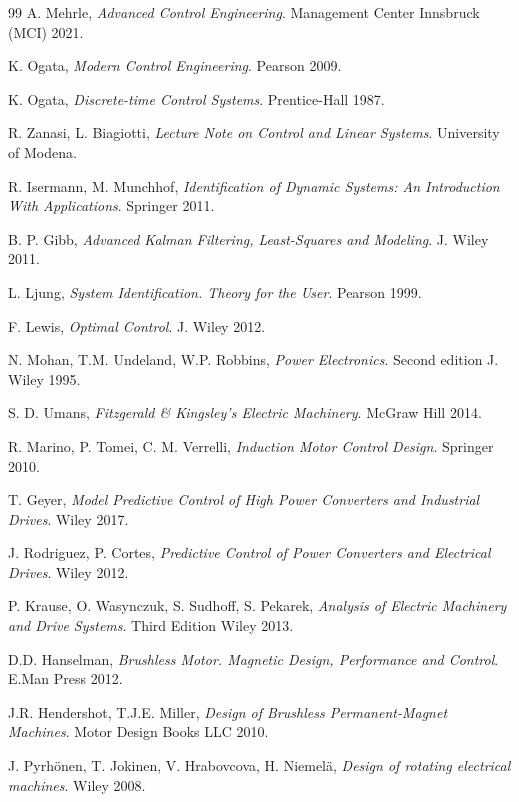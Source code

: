 \documentclass[12pt,a4paper,oneside]{book}
\begin{document}
\clearpage
\begin{thebibliography}{99}
	A. Mehrle, \emph{Advanced Control Engineering}. Management Center Innsbruck (MCI) 2021.
	
	K. Ogata, \emph{Modern Control Engineering}. Pearson 2009.	
	
	K. Ogata, \emph{Discrete-time Control Systems}. Prentice-Hall 1987.
	
	R. Zanasi, L. Biagiotti, \emph{Lecture Note on Control and Linear Systems}. University of Modena.
	
	R. Isermann, M. Munchhof, \emph{Identification of Dynamic Systems: An Introduction With Applications}. Springer 2011.
	
	B. P. Gibb, \emph{Advanced Kalman Filtering, Least-Squares and Modeling}. J. Wiley 2011.

	L. Ljung,  \emph{System Identification. Theory for the User}. Pearson 1999.

	F. Lewis, \emph{Optimal Control}. J. Wiley 2012.

	N. Mohan, T.M. Undeland, W.P. Robbins, \emph{Power Electronics}. Second edition J. Wiley 1995.
	
	S. D. Umans, \emph{Fitzgerald \& Kingsley's Electric Machinery}. McGraw Hill 2014.

	R. Marino, P. Tomei, C. M. Verrelli, \emph{Induction Motor Control Design}.  Springer 2010.

	T. Geyer, \emph{Model Predictive Control of High Power Converters and Industrial Drives}. Wiley 2017.
	
	J. Rodriguez, P. Cortes, \emph{Predictive Control of Power Converters and Electrical Drives}. Wiley 2012.
	
	P. Krause, O. Wasynczuk, S. Sudhoff, S. Pekarek, \emph{Analysis of Electric Machinery and Drive Systems}. Third Edition Wiley 2013.
	
	D.D. Hanselman,  \emph{Brushless Motor. Magnetic Design, Performance and Control}. E.Man Press 2012.
	
	J.R. Hendershot, T.J.E. Miller, \emph{Design of Brushless Permanent-Magnet Machines}. Motor Design Books LLC 2010.
	
	J. Pyrhönen, T. Jokinen, V. Hrabovcova, H. Niemelä,  \emph{Design of rotating electrical machines}. Wiley 2008.
	

\end{thebibliography}
\end{document}
